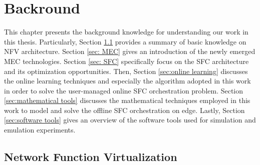 \chapter{\textbf{Backround}}
This chapter presents the background knowledge for understanding our work in this thesis. Particularly, Section \ref{sec:NFV} provides a summary of basic knowledge on NFV architecture. Section \ref{sec: MEC} gives an introduction of the newly emerged MEC technologies. Section \ref{sec: SFC} specifically focus on the SFC architecture and its optimization opportunities. Then, Section \ref{sec:online learning} discusses the online learning techniques and especially the \ccmab algorithm adopted in this work in order to solve the user-managed online SFC orchestration problem. Section \ref{sec:mathematical tools} discusses the mathematical techniques employed in this work to model and solve the offline SFC orchestration on edge. Lastly, Section \ref{sec:software tools} gives an overview of the software tools used for simulation and emulation experiments.


\section{Network Function Virtualization}
\label{sec:NFV}
